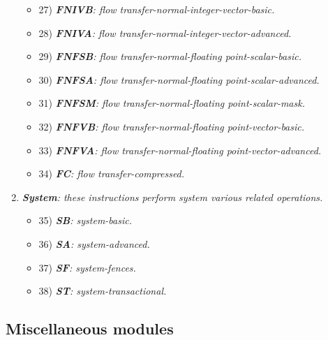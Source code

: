 \begin{enumerate}
\begin{itemize}
                    \item 27) \textit{\textbf{FNIVB}: flow transfer-normal-integer-vector-basic.}
                    \item 28) \textit{\textbf{FNIVA}: flow transfer-normal-integer-vector-advanced.}

                    \item 29) \textit{\textbf{FNFSB}: flow transfer-normal-floating point-scalar-basic.}
                    \item 30) \textit{\textbf{FNFSA}: flow transfer-normal-floating point-scalar-advanced.}
                    \item 31) \textit{\textbf{FNFSM}: flow transfer-normal-floating point-scalar-mask.}

                    \item 32) \textit{\textbf{FNFVB}: flow transfer-normal-floating point-vector-basic.}
                    \item 33) \textit{\textbf{FNFVA}: flow transfer-normal-floating point-vector-advanced.}

                    \item 34) \textit{\textbf{FC}: flow transfer-compressed.}

                \end{itemize}

            \item \textit{\textbf{System}: these instructions perform system various related operations.}

                \begin{itemize}

                    \item 35) \textit{\textbf{SB}: system-basic.}
                    \item 36) \textit{\textbf{SA}: system-advanced.}
                    \item 37) \textit{\textbf{SF}: system-fences.}
                    \item 38) \textit{\textbf{ST}: system-transactional.}

                \end{itemize}

        \end{enumerate}

    \subsection{Miscellaneous modules}

